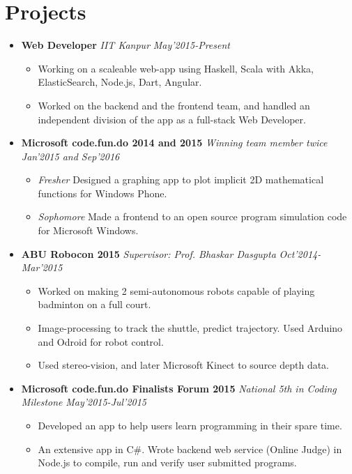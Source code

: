 \documentclass[11pt,a4paper]{moderncv}
\newcommand{\experience}[4]{
\vspace{0.1cm}
\item \textbf{\large{#1}} \emph{#2} \hfill \textit{#3}
  \begin{itemize}[leftmargin=*]
    \setlength\itemsep{0em} #4
  \end{itemize}
}
\begin{document}
\vspace{-0.1cm}
\section*{Projects}
\begin{itemize}
  \setlength\itemsep{0.5em}
\experience{Web Developer}{IIT Kanpur}{May'2015-Present}{
    \item Working on a scaleable web-app using Haskell, Scala with Akka, ElasticSearch, Node.js, Dart, Angular.
    \item Worked on the backend and the frontend team, and handled an independent division of the app as a full-stack Web Developer.
    }

\experience{Microsoft code.fun.do 2014 and 2015}{Winning team member twice}{Jan'2015 and Sep'2016}{
    \item \textit{Fresher} Designed a graphing app to plot implicit 2D mathematical functions for Windows Phone.
    \item \textit{Sophomore} Made a frontend to an open source program simulation code for Microsoft Windows.
    }

\experience{ABU Robocon 2015}{Supervisor: Prof. Bhaskar Dasgupta}{Oct'2014-Mar'2015}{
    \item Worked on making 2 semi-autonomous robots capable of playing badminton on a full court.
    \item Image-processing to track the shuttle, predict trajectory. Used Arduino and Odroid for robot control.
    \item Used stereo-vision, and later Microsoft Kinect to source depth data.
    }

\experience{Microsoft code.fun.do Finalists Forum 2015}{National 5th in Coding Milestone}{May'2015-Jul'2015}{
    \item Developed an app to help users learn programming in their spare time.
    \item An extensive app in C\#. Wrote backend web service (Online Judge) in Node.js to compile, run and verify user submitted programs.
    }
    \end{itemize}
\end{document}
